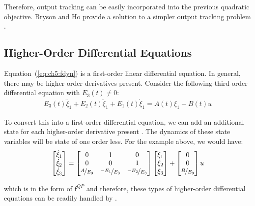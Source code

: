 \noindent Therefore, output tracking can be easily incorporated into the previous quadratic objective. 
Bryson and Ho provide a  solution to a simpler output tracking problem \cite{Bryson1975a}.

\subsection{Higher-Order Differential Equations} \label{sec:ch5:higher:order}

Equation~(\ref{eq:ch5:fdyn}) is a first-order linear differential equation. 
In general, there may be higher-order derivatives present.
Consider the following third-order differential equation with $E_3(t) \neq 0$:
\begin{align}
E_3(t)\dddot{\xi}_1+ E_2(t)\ddot{\xi}_1 + E_1(t)\dot{\xi}_1 = A(t)\xi_1 + B(t) u
\end{align}

\noindent To convert this into a first-order differential equation, we can add an additional state for each higher-order derivative present \cite{Stryk1999a}.
The dynamics of these state variables will be state of one order less.
For the example above, we would have:
\begin{align}
\begin{bmatrix}
\dot{\xi}_1 \\ \dot{\xi}_2 \\ \dot{\xi}_3
\end{bmatrix}
=
\begin{bmatrix}
0 & 1 & 0 \\
0 & 0 & 1 \\
\nicefrac{A}{E_3} & \nicefrac{-E_1}{E_3} & \nicefrac{-E_2}{E_3} \\
\end{bmatrix}
\begin{bmatrix}
\xi_1 \\ \xi_2 \\ \xi_3
\end{bmatrix}
+ 
\begin{bmatrix}
 0 \\ 0 \\ \nicefrac{B}{E_3}
\end{bmatrix} u
\end{align}

\noindent which is in the form of $\bm{f}^{QP}$ and therefore, these types of higher-order differential equations can be readily handled by \lqdo{}.

